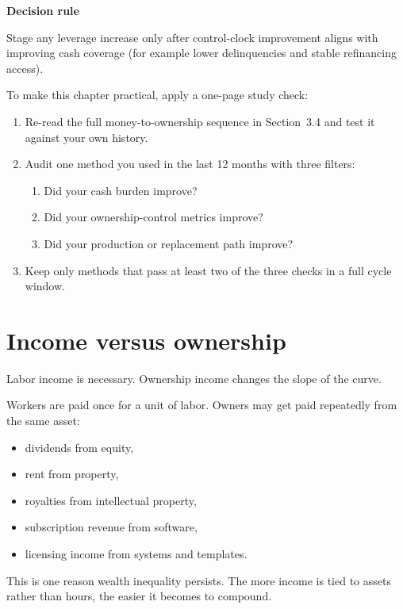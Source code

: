 \documentclass[11pt,openany]{book}
\begin{document}
\begin{notebox}
\textbf{Decision rule}\par
Stage any leverage increase only after control-clock improvement aligns with improving cash coverage (for example lower delinquencies and stable refinancing access).
\end{notebox}

To make this chapter practical, apply a one-page study check:

\begin{enumerate}
  \item Re-read the full money-to-ownership sequence in Section~3.4 and test it against your own history.
  \item Audit one method you used in the last 12 months with three filters:
    \begin{enumerate}[label*=\arabic*.]
      \item Did your cash burden improve?
      \item Did your ownership-control metrics improve?
      \item Did your production or replacement path improve?
    \end{enumerate}
  \item Keep only methods that pass at least two of the three checks in a full cycle window.
\end{enumerate}

\section{Income versus ownership}

Labor income is necessary. Ownership income changes the slope of the curve.

Workers are paid once for a unit of labor. Owners may get paid repeatedly from the same asset:

\begin{itemize}
  \item dividends from equity,
  \item rent from property,
  \item royalties from intellectual property,
  \item subscription revenue from software,
  \item licensing income from systems and templates.
\end{itemize}

This is one reason wealth inequality persists. The more income is tied to assets rather than hours, the easier it becomes to compound.
\end{document}
